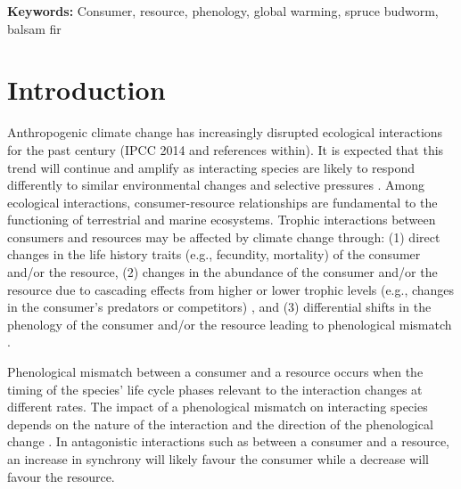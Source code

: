 \documentclass[12 pt]{article}
\begin{document}
\noindent \textbf{Keywords:} Consumer, resource, phenology, global warming, spruce budworm, balsam fir

\clearpage

\section{Introduction}
Anthropogenic climate change has increasingly disrupted ecological interactions for the past century (IPCC 2014 and references within). It is expected that this trend will continue and amplify as interacting species are likely to respond differently to similar environmental changes and selective pressures \citep{Parmesan2006}. Among ecological interactions, consumer-resource relationships are fundamental to the functioning of terrestrial and marine ecosystems. Trophic interactions between consumers and resources may be affected by climate change through: (1) direct changes in the life history traits (e.g., fecundity, mortality) of the consumer and/or the resource, (2) changes in the abundance of the consumer and/or the resource due to cascading effects from higher or lower trophic levels (e.g., changes in the consumer’s predators or competitors) \citep{Both2009}, and (3) differential shifts in the phenology of the consumer and/or the resource leading to phenological mismatch \citep{Kharouba2018}.\par
Phenological mismatch between a consumer and a resource occurs when the timing of the species' life cycle phases relevant to the interaction changes at different rates. The impact of a phenological mismatch on interacting species depends on the nature of the interaction and the direction of the phenological change \citep{Renner2018}. In antagonistic interactions such as between a consumer and a resource, an increase in synchrony will likely favour the consumer while a decrease will favour the resource. \par
\end{document}
